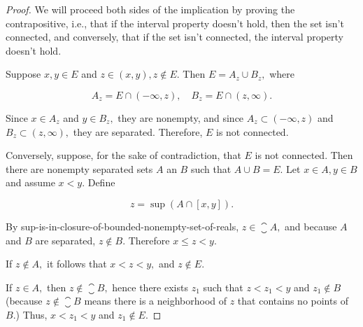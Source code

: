 \documentclass{article}
\begin{document}
\begin{proof}
We will proceed both sides of the implication by proving the contrapositive, i.e., that if the interval property doesn't hold, then the set isn't \@{connected}, and conversely, that if the set isn't connected, the interval property doesn't hold.

Suppose $x, y \in E$ and $z \in (x, y), z \notin E.$ Then $E = A_z \cup B_z,$ where

\[ A_z = E \cap (- \infty, z), \quad B_z = E \cap (z, \infty). \]

Since $x \in A_z$ and $y \in B_z,$ they are nonempty, and since $A_z \subset (- \infty, z)$ and $B_z \subset (z, \infty),$ they are \@{separated}. Therefore, $E$ is not connected.

Conversely, suppose, for the sake of contradiction, that $E$ is not connected. Then there are nonempty separated sets $A$ an $B$ such that $A \cup B = E.$ Let $x \in A, y \in B$ and assume $x < y.$ Define

\[ z = \sup{(A \cap [x, y])}. \]

By \@{sup-is-in-closure-of-bounded-nonempty-set-of-reals}, $z \in \closure{A},$ and because $A$ and $B$ are separated, $z \notin B.$ Therefore $x \leq z < y.$

If $z \notin A,$ it follows that $x < z < y,$ and $z \notin E.$

If $z \in A,$ then $z \notin \closure{B},$ hence there exists $z_1$ such that $z < z_1 < y$ and $z_1 \notin B$ (because $z \notin \closure{B}$ means there is a \@{neighborhood} of $z$ that contains no points of $B$.) Thus, $x < z_1 < y$ and $z_1 \notin E.$
\end{proof}
\end{document}

